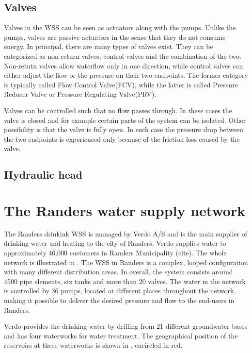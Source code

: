 \subsection{Valves}
\label{valves}

Valves in the WSS can be seen as actuators along with the pumps. Unlike the pumps, valves are passive actuators in the sense that they do not consume energy. In principal, there are many types of valves exist. They can be categorized as non-return valves, control valves and the combination of the two. Non-retutn valves allow waterflow only in one direction, while control valves can either adjust the flow or the pressure on their two endpoints. The former category is typically called Flow Control Valve(FCV), while the latter is called Pressure Reducer Valve or Pressure Regulating Valve(PRV). 

Valves can be controlled such that no flow passes through. In these cases the valve is closed and for example certain parts of the system can be isolated. Other possibility is that the valve is fully open. In such case the pressure drop between the two endpoints is experienced only because of the friction loss caused by the valve. 

\subsection{Hydraulic head}
\label{hydraulic_head}

\section{The Randers water supply network}
\label{the_randers_water_supply_network}

The Randers drinkink WSS is managed by Verdo A/S and is the main supplier of drinking water and heating to the city of Randers. Verdo supplies water to approximately 46.000 customers in Randers Municipality (cite). The whole network is illustrated in . The WSS in Randers is a complex, looped configuration with many different distribution areas. In overall, the system consists around 4500 pipe elements, six tanks and more than 20 valves. The water in the network is controlled by 36 pumps, located at different places throughout the network, making it possible to deliver the desired pressure and flow to the end-users in Randers.

Verdo provides the drinking water by drilling from 21 different groundwater bases and has four waterworks for water treatment. The geographical position of the reservoirs at these waterworks is shown in , encircled in red.   

